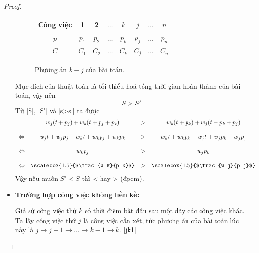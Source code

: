 \begin{proof}
\begin{itemize}
	\begin{figure}[h!]
		\centering
		 \begin{tabular}{|c | c c c c c c c |} 
		 \hline
		 Công việc & 1 & 2 & $\ldots$ & $k$ & $j$ & $\ldots$ & $n$ \\
		 \hline\hline
		 $p$ & $p_1$ & $p_2$ & $\ldots$ & $p_k$ & $p_j$ & $\ldots$ & $p_n$ \\
		 $C$ & $C_1$ & $C_2$ & $\ldots$ & $C_k$ & $C_j$ & $\ldots$ & $C_n$ \\
		 \hline
		 \end{tabular}
	\caption{Phương án $k - j$ của bài toán.}
	\end{figure}

	Mục đích của thuật toán là tối thiểu hoá tổng thời gian hoàn thành của bài toán, vậy nên
	\begin{equation} \label{s>s'}
		S > S'
	\end{equation}
	Từ \eqref{S}, \eqref{S'} và \eqref{s>s'} ta được
        \begin{equation*}
        \begin{array}{c c c c}
		& w_j(t+p_j) + w_k(t+p_j+p_k) &>& w_k(t+p_k) + w_j(t+p_k+p_j) \\
		\\
		\Leftrightarrow & w_jt + w_jp_j + w_kt + w_k p_j + w_kp_k &>& w_k t + w_k p_k + w_j t + w_j p_k + w_j p_j \\
		\\
		\Leftrightarrow & w_k p_j &>& w_j p_k \\
		\\
		\Leftrightarrow & \scalebox{1.5}{$\frac{w_k}{p_k}$} &>& \scalebox{1.5}{$\frac{w_j}{p_j}$} \\
        \end{array}
        \end{equation*}
		Vậy nếu muốn $S'<S$ thì  <  hay  >  (đpcm).

\phantom{text}

\item \textbf{Trường hợp công việc không liền kề:}

Giả sử công việc thứ $k$ có thời điểm bắt đầu sau một dãy các công việc khác. Ta lấy công việc thứ $j$ là công việc cần xét, tức phương án của bài toán lúc này là $j \rightarrow j+1 \rightarrow \ldots \rightarrow k-1 \rightarrow k$. \eqref{jk1}


\end{itemize}
\end{proof}
